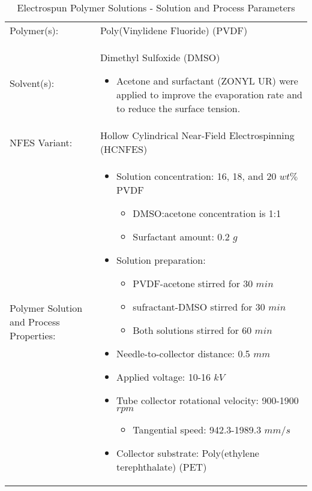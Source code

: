 \begin{table}[th]
\caption{Electrospun Polymer Solutions - Solution and Process Parameters}
\begin{center}
\begin{tabular}{
>{\raggedright\arraybackslash}p{}
>{\raggedright\arraybackslash}p{} }

\hline
Polymer(s): &
Poly(Vinylidene Fluoride) (PVDF) \\

\arrayrulecolor{lightgray}\hline
Solvent(s): &
Dimethyl Sulfoxide (DMSO)
    \begin{itemize}[leftmargin=*]
    \item Acetone and surfactant (ZONYL UR) were applied to improve the evaporation rate and to reduce the surface tension.
    \end{itemize} \\

\hline
NFES Variant: &
Hollow Cylindrical Near-Field Electrospinning (HCNFES) \\

\hline
Polymer Solution and Process Properties: &
\begin{itemize}[leftmargin=*]
\item Solution concentration: 16, 18, and 20 $w t \%$ PVDF
    \begin{itemize}[leftmargin=*]
    \item DMSO:acetone concentration is 1:1
    \item Surfactant amount: 0.2 $g$
    \end{itemize}
\item Solution preparation:
    \begin{itemize}[leftmargin=*]
    \item PVDF-acetone stirred for 30 $min$
    \item sufractant-DMSO stirred for 30 $min$
    \item Both solutions stirred for 60 $min$
    \end{itemize}
\item Needle-to-collector distance: 0.5 $m m$
\item Applied voltage: 10-16 $k V$
\item Tube collector rotational velocity: 900-1900 $rpm$
    \begin{itemize}[leftmargin=*]
    \item Tangential speed: 942.3-1989.3 $m m / s$
    \end{itemize}
\item Collector substrate: Poly(ethylene terephthalate) (PET)
\end{itemize} \\


\end{tabular}
\end{center}
\end{table}
